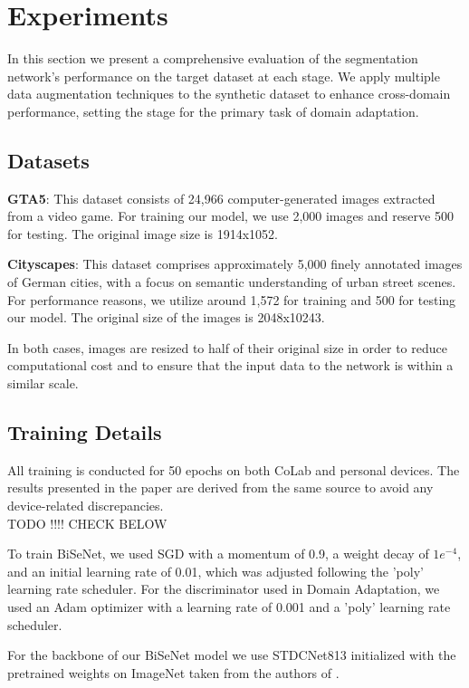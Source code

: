 \documentclass[10pt,twocolumn,letterpaper]{article}
\begin{document}
\section{Experiments}
In this section we present a comprehensive evaluation of the segmentation network’s performance on the target dataset at each stage. We apply multiple data augmentation techniques to the synthetic dataset to enhance cross-domain performance, setting the stage for the primary task of domain adaptation.

\subsection{Datasets}

\textbf{GTA5}: This dataset \cite{GroundTruth} consists of 24,966 computer-generated images extracted from a video game. For training our model, we use 2,000 images and reserve 500 for testing. The original image size is 1914x1052.

\textbf{Cityscapes}: This dataset \cite{City} comprises approximately 5,000 finely annotated images of German cities, with a focus on semantic understanding of urban street scenes. For performance reasons, we utilize around 1,572 for training and 500 for testing our model. The original size of the images is 2048x10243.

In both cases, images are resized to half of their original size in order to reduce computational cost and to ensure that the input data to the network is within a similar scale.

\subsection{Training Details}
All training is conducted for 50 epochs on both CoLab and personal devices. The results presented in the paper are derived from the same source to avoid any device-related discrepancies.\\

TODO !!!! CHECK BELOW

To train BiSeNet, we used SGD with a momentum of 0.9, a weight decay of $1e^{-4}$, and an initial learning rate of 0.01, which was adjusted following the 'poly' learning rate scheduler. For the discriminator used in Domain Adaptation, we used an Adam optimizer with a learning rate of 0.001 and a 'poly' learning rate scheduler.

For the backbone of our BiSeNet model we use STDCNet813 initialized with the pretrained weights on ImageNet taken from the authors of \cite{RealTimeBiSeNet}.\\
\end{document}

